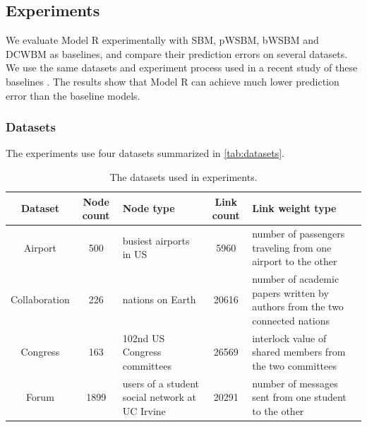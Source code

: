 \documentclass{article}
\begin{document}
\subsection{Experiments}
We evaluate Model R experimentally with SBM, pWSBM, bWSBM and DCWBM as baselines,
and compare their prediction errors on several datasets.
We use the same datasets and experiment process used in a recent study of these baselines \cite{aicher2014learning}.
The results show 
that Model R can achieve much lower prediction error than the baseline models.

\subsubsection{Datasets}
The experiments use four datasets summarized in \autoref{tab:datasets}.
\begin{table}[!htb]\centering
	\caption{The datasets used in experiments.}
	\begin{tabularx}{\textwidth}{|c|c|X|c|X|}  \hline \rowcolor{blue!40}
		Dataset & Node count & Node type & Link count & Link weight type \\ \hline
		Airport\cite{colizza2007reaction} & 500 & busiest airports in US & 5960 & number of passengers traveling from one airport to the other\\ \hline
		Collaboration\cite{pan2012world} & 226 & nations on Earth & 20616 & number of academic papers written by authors from the two connected nations \\ \hline
		Congress\cite{porter2005network} & 163  & 102nd US Congress committees & 26569 & interlock value of shared members from the two committees \\ \hline
		Forum\cite{opsahl2009clustering}  & 1899 & users of a student social network at UC Irvine & 20291 & number of messages sent from one student to the other \\ \hline
	\end{tabularx}
	\label{tab:datasets}
\end{table}
\end{document}
